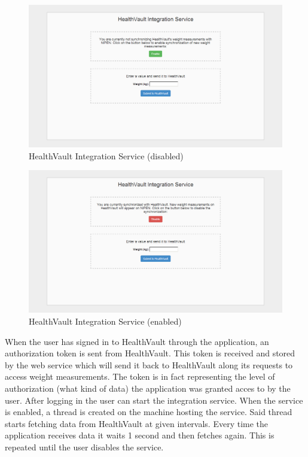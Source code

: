 \begin{figure}[H]
\centering
\includegraphics[scale=0.4]{../Figures/webservice-not-polling.png}
\caption{HealthVault Integration Service (disabled)}
\label{figure:webservice-not-polling}
\end{figure}

\begin{figure}[H]
\centering
\includegraphics[scale=0.4]{../Figures/webservice-polling.png}
\caption{HealthVault Integration Service (enabled)}
\label{figure:webservice-polling}
\end{figure}

When the user has signed in to HealthVault through the application, an authorization token
is sent from HealthVault. This token is received and stored by the web service which
will send it back to HealthVault along its requests to access weight measurements.
The token is in fact representing the level of authorization (what kind of data) the application
was granted acces to by the user.
After logging in the user can start the integration service.
When the service is enabled, a thread is created on the machine hosting the service.
Said thread starts fetching data from HealthVault at given intervals.
Every time the application receives data it waits 1 second and then fetches again.
This is repeated until the user disables the service.

